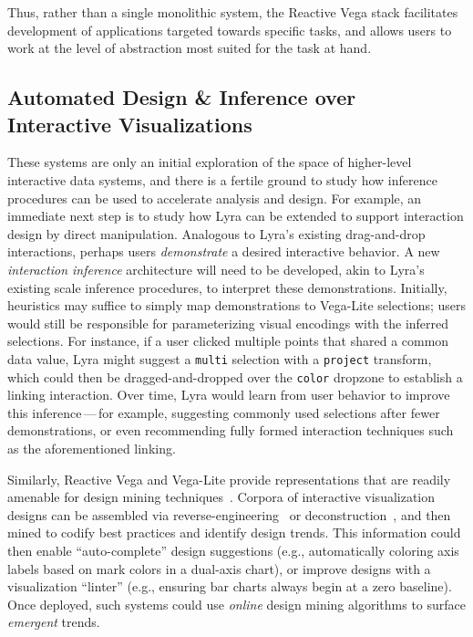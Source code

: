 Thus, rather than a single monolithic system, the Reactive Vega stack
facilitates development of applications targeted towards specific tasks, and
allows users to work at the level of abstraction most suited for the task at
hand.

\vspace{-10pt}

\subsection{Automated Design \& Inference over Interactive Visualizations}

\vspace{-7pt}

These systems are only an initial exploration of the space of higher-level
interactive data systems, and there is a fertile ground to study how inference
procedures can be used to accelerate analysis and design. For example, an
immediate next step is to study how Lyra can be extended to support interaction
design by direct manipulation. Analogous to Lyra's existing drag-and-drop
interactions, perhaps users \emph{demonstrate} a desired interactive behavior. A
new \emph{interaction inference} architecture will need to be developed, akin to
Lyra's existing scale inference procedures, to interpret these demonstrations.
Initially, heuristics may suffice to simply map demonstrations to Vega-Lite
selections; users would still be responsible for parameterizing visual encodings
with the inferred selections. For instance, if a user clicked multiple points
that shared a common data value, Lyra might suggest a \texttt{multi} selection
with a \texttt{project} transform, which could then be dragged-and-dropped over
the \texttt{color} dropzone to establish a linking interaction. Over time, Lyra
would learn from user behavior to improve this inference\,---\,for example,
suggesting commonly used selections after fewer demonstrations, or even
recommending fully formed interaction techniques such as the aforementioned
linking.

Similarly, Reactive Vega and Vega-Lite provide representations that are readily
amenable for design mining techniques~\cite{kumar:webzeitgeist}. Corpora of
interactive visualization designs can be assembled via
reverse-engineering~\cite{poco:reverse} or
deconstruction~\cite{harper:deconstructing,harper:templates}, and then mined to
codify best practices and identify design trends. This information could then
enable ``auto-complete'' design suggestions (e.g., automatically coloring axis
labels based on mark colors in a dual-axis chart), or improve designs with a
visualization ``linter'' (e.g., ensuring bar charts always begin at a zero
baseline). Once deployed, such systems could use \emph{online} design mining
algorithms to surface \emph{emergent} trends.

